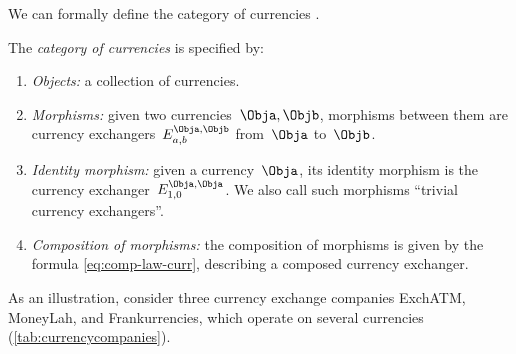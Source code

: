 
We can formally define the category of currencies \Curr.

\begin{definition}
    \label{def:Curr}
    The \emph{category of currencies} \Curr is specified by:
    \begin{enumerate}
        \item \emph{Objects:} a collection of currencies.
        \item \emph{Morphisms:} given two currencies~$\Obja, \Objb$, morphisms between them are currency exchangers~$E_{a,b}^{\Obja,\Objb}$ from~$\Obja$ to~$\Objb$.
        \item \emph{Identity morphism:} given a currency~$\Obja$, its identity morphism is the currency exchanger~$E_{1,0}^{\Obja,\Obja}$.
        We also call such morphisms ``trivial currency exchangers''.
        \item \emph{Composition of morphisms:} the composition of morphisms is given by the formula \cref{eq:comp-law-curr}, describing a composed currency exchanger.
    \end{enumerate}
\end{definition}

As an illustration, consider three currency exchange companies ExchATM, MoneyLah, and Frankurrencies, which operate on several currencies (\cref{tab:currencycompanies}).

